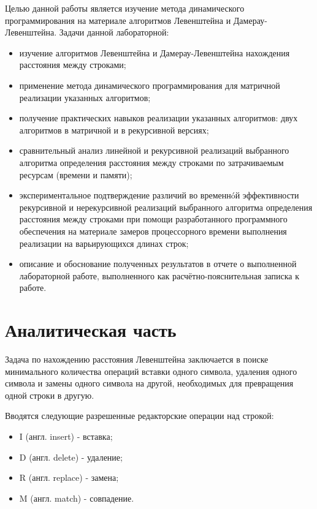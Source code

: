 \documentclass[14pt]{report}
\begin{document}
Целью данной работы является изучение метода динамического программирования на материале алгоритмов Левенштейна и Дамерау-Левенштейна.
Задачи данной лабораторной:
\begin{itemize}
	\item изучение алгоритмов Левенштейна и Дамерау-Левенштейна нахождения расстояния между строками;
	\item применение метода динамического программирования для матричной реализации указанных алгоритмов;
	\item получение практических навыков реализации указанных алгоритмов:  двух алгоритмов в матричной и в рекурсивной версиях;
	\item сравнительный анализ линейной и рекурсивной реализаций выбранного алгоритма определения расстояния между строками по затрачиваемым ресурсам (времени и памяти);
	\item экспериментальное подтверждение различий во временнóй эффективности рекурсивной и нерекурсивной реализаций выбранного алгоритма определения расстояния между строками при помощи разработанного программного обеспечения на материале замеров процессорного времени выполнения реализации на варьирующихся длинах строк;
	\item описание и обоснование полученных результатов в отчете о выполненной лабораторной работе, выполненного как расчётно-пояснительная записка к работе.
\end{itemize}

\chapter*{Аналитическая часть}

Задача по нахождению расстояния Левенштейна заключается в поиске минимального количества операций вставки одного символа, удаления одного символа и замены одного символа на другой, необходимых для превращения одной строки в другую.

Вводятся следующие разрешенные редакторские операции над строкой:
\begin{itemize}
	\item I (англ. insert) - вставка;
	\item D (англ. delete) - удаление;
	\item R (англ. replace) - замена;
	\item M (англ. match) - совпадение.
\end{itemize}
\end{document}
